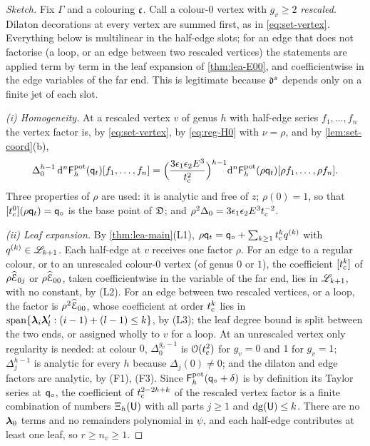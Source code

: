 \begin{proof}[Sketch]
Fix $\Gamma$ and a colouring $\mathfrak{c}$. Call a colour-$0$ vertex with $g_{v}\geq 2$ \emph{rescaled}. Dilaton decorations at every vertex are summed first, as in \eqref{eq:set-vertex}. Everything below is multilinear in the half-edge slots; for an edge that does not factorise (a loop, or an edge between two rescaled vertices) the statements are applied term by term in the leaf expansion of \cref{thm:lea-E00}, and coefficientwise in the edge variables of the far end. This is legitimate because $\mathfrak{d}^s$ depends only on a finite jet of each slot.

\emph{(i) Homogeneity.} At a rescaled vertex $v$ of genus $h$ with half-edge series $f_1,\dots,f_n$ the vertex factor is, by \eqref{eq:set-vertex}, by \eqref{eq:reg-H0} with $\nu=\rho$, and by \cref{lem:set-coord}\textup{(b)},
\[
\Delta_0^{h-1}\,\mathrm{d}^n\mathsf{F}^{\mathrm{pot}}_h(\mathsf{q}_{t})[f_1,\dots,f_n]=\Big(\frac{3\epsilon_1\epsilon_2E^3}{t_{\mathrm{c}}^2}\Big)^{h-1}\mathrm{d}^n\mathsf{F}^{\mathrm{pot}}_h(\rho\mathsf{q}_{t})[\rho f_1,\dots,\rho f_n].
\]
Three properties of $\rho$ are used: it is analytic and free of $z$; $\rho(0)=1$, so that $[t_{\mathrm{c}}^0](\rho\mathsf{q}_{t})=\mathsf{q}_{\circ}$ is the base point of $\mathfrak{D}$; and $\rho^2\Delta_0=3\epsilon_1\epsilon_2E^3t_{\mathrm{c}}^{-2}$.

\emph{(ii) Leaf expansion.} By \cref{thm:lea-main}\textup{(L1)}, $\rho\mathsf{q}_{t}=\mathsf{q}_{\circ}+\sum_{k\geq 1}t_{\mathrm{c}}^k q^{(k)}$ with $q^{(k)}\in\mathscr{L}_{k+1}$. Each half-edge at $v$ receives one factor $\rho$. For an edge to a regular colour, or to an unrescaled colour-$0$ vertex (of genus $0$ or $1$), the coefficient $[t_{\mathrm{c}}^k]$ of $\rho\widehat{\mathcal{E}}_{0j}$ or $\rho\widehat{\mathcal{E}}_{00}$, taken coefficientwise in the variable of the far end, lies in $\mathscr{L}_{k+1}$, with no constant, by \textup{(L2)}. For an edge between two rescaled vertices, or a loop, the factor is $\rho^2\widehat{\mathcal{E}}_{00}$, whose coefficient at order $t_{\mathrm{c}}^k$ lies in $\mathrm{span}\{\boldsymbol{\lambda}_i\boldsymbol{\lambda}_l':(i-1)+(l-1)\leq k\}$, by \textup{(L3)}; the leaf degree bound is split between the two ends, or assigned wholly to $v$ for a loop. At an unrescaled vertex only regularity is needed: at colour $0$, $\Delta_0^{g_v-1}$ is $\mathcal{O}(t_{\mathrm{c}}^2)$ for $g_v=0$ and $1$ for $g_v=1$; $\Delta_j^{h-1}$ is analytic for every $h$ because $\Delta_j(0)\neq0$; and the dilaton and edge factors are analytic, by \textup{(F1), (F3)}. Since $\mathsf{F}^{\mathrm{pot}}_h(\mathsf{q}_{\circ}+\delta)$ is by definition its Taylor series at $\mathsf{q}_{\circ}$, the coefficient of $t_{\mathrm{c}}^{2-2h+k}$ of the rescaled vertex factor is a finite combination of numbers $\Xi_h(\mathsf{U})$ with all parts $j\geq 1$ and $\mathrm{dg}(\mathsf{U})\leq k$. There are no $\boldsymbol{\lambda}_0$ terms and no remainders polynomial in $\psi$, and each half-edge contributes at least one leaf, so $r\geq n_{v}\geq 1$.


\end{proof}
